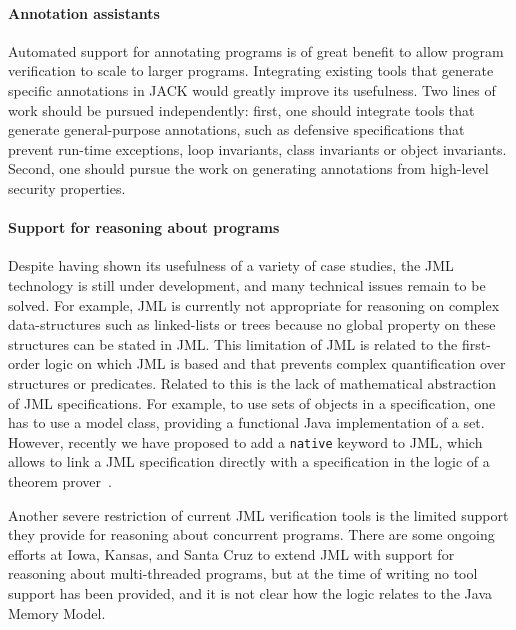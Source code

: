 \paragraph{Annotation assistants}
Automated support for annotating programs is of great benefit to allow
program verification to scale to larger programs. Integrating existing
tools that generate specific annotations in JACK would greatly improve
its usefulness. Two lines of work should be pursued independently:
first, one should integrate tools that generate general-purpose
annotations, such as defensive specifications that prevent run-time
exceptions, loop invariants, class invariants or object invariants.
Second, one should pursue the work on generating annotations from 
high-level security properties.


\paragraph{Support for reasoning about programs}
Despite having shown its usefulness of a variety of case studies, the
JML technology is still under development, and many technical issues
remain to be solved. For example, JML is currently not appropriate for
reasoning on complex data-structures such as linked-lists or trees
because no global property on these structures can be stated in JML.
This limitation of JML is related to the first-order logic on which
JML is based and that prevents complex quantification over structures
or predicates. Related to this is the lack of mathematical abstraction
of JML specifications. For example, to use sets of objects in a
specification, one has to use a model class, providing a functional Java
implementation of a set. However, recently we have proposed to add a
\texttt{native} keyword to JML, which allows to link a JML
specification directly with a specification in the logic of a theorem
prover~\cite{Charles06}. 

Another severe restriction of current JML verification
tools is the limited support they provide for reasoning about
concurrent programs.  There are some ongoing efforts at Iowa, Kansas,
and Santa Cruz to extend JML with support for reasoning about
multi-threaded programs, but at the time of writing no tool support
has been provided, and it is not clear how the logic relates to the
Java Memory Model.



